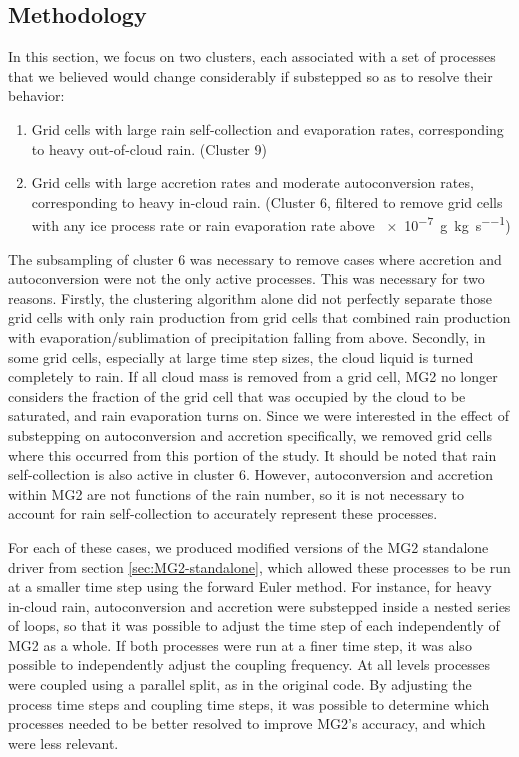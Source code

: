 \documentclass [11pt, proquest] {uwthesis}[2020/02/24]
\begin{document}
\subsection{Methodology}

In this section, we focus on two clusters, each associated with a set of processes that we believed would change considerably if substepped so as to resolve their behavior:

\begin{enumerate}
\item Grid cells with large rain self-collection and evaporation rates, corresponding to heavy out-of-cloud rain. (Cluster 9)
\item Grid cells with large accretion rates and moderate autoconversion rates, corresponding to heavy in-cloud rain. (Cluster 6, filtered to remove grid cells with any ice process rate or rain evaporation rate above \SI{e-7}{\gram\per\kilo\gram\per\second})
\end{enumerate}

The subsampling of cluster 6 was necessary to remove cases where accretion and autoconversion were not the only active processes. This was necessary for two reasons. Firstly, the clustering algorithm alone did not perfectly separate those grid cells with only rain production from grid cells that combined rain production with evaporation/sublimation of precipitation falling from above. Secondly, in some grid cells, especially at large time step sizes, the cloud liquid is turned completely to rain. If all cloud mass is removed from a grid cell, MG2 no longer considers the fraction of the grid cell that was occupied by the cloud to be saturated, and rain evaporation turns on. Since we were interested in the effect of substepping on autoconversion and accretion specifically, we removed grid cells where this occurred from this portion of the study. It should be noted that rain self-collection is also active in cluster 6. However, autoconversion and accretion within MG2 are not functions of the rain number, so it is not necessary to account for rain self-collection to accurately represent these processes.

For each of these cases, we produced modified versions of the MG2 standalone driver from section \ref{sec:MG2-standalone}, which allowed these processes to be run at a smaller time step using the forward Euler method. For instance, for heavy in-cloud rain, autoconversion and accretion were substepped inside a nested series of loops, so that it was possible to adjust the time step of each independently of MG2 as a whole. If both processes were run at a finer time step, it was also possible to independently adjust the coupling frequency. At all levels processes were coupled using a parallel split, as in the original code. By adjusting the process time steps and coupling time steps, it was possible to determine which processes needed to be better resolved to improve MG2's accuracy, and which were less relevant.
\end{document}
